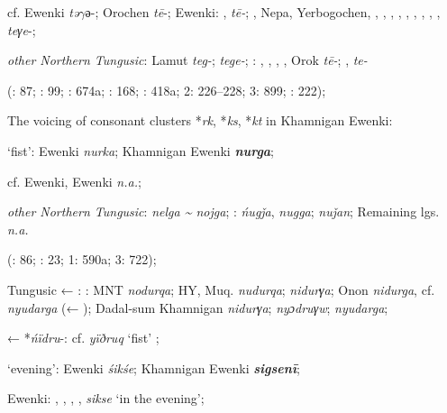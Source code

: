 \documentclass[output=paper,colorlinks,citecolor=brown]{langscibook}
\begin{document}
    cf.  Ewenki \textit{tǝ$\gamma ǝ$}{}-; Orochen \textit{tē}{}-;  Ewenki: ,  \textit{tē-}; , Nepa, Yerbogochen, , , , , , , , , ,  \textit{teγe}{}-;

    \textit{other Northern Tungusic}: Lamut \textit{teg-};  \textit{tege-}; \textit{}: , , , , Orok \textit{tē-}; ,  \textit{te-}
    
    (\citealt{Castrén1856}: 87; \citealt{Janhunen1991}: 99; \citealt{Dorji1998}: 674a; \citealt{Chaoke2014a}: 168; \citealt{Vasilevic1958}: 418a; \citealt{Cincius1975B} 2: 226--228; \citealt{Hauer1952} 3: 899; \citealt{Zikmundová2013a}: 222);
\z
\z


\ea
The voicing of consonant clusters *\textit{rk}, *\textit{ks}, *\textit{kt} in Khamnigan Ewenki:

\ea ‘fist’:  Ewenki \textit{nurka}; Khamnigan Ewenki \textbf{\textit{nurga}};

    cf.  Ewenki,  Ewenki \textit{n.a.};

    \textit{other Northern Tungusic}:  \textit{nelga {\textasciitilde} nojga}; \textit{}:  \textit{ńugǰa},  \textit{nugga};  \textit{nuǰan}; Remaining lgs. \textit{n.a.}
    
    (\citealt{Castrén1856}: 86; \citealt{Janhunen1991}: 23; \citealt{Cincius1975B} 1: 590a; \citealt{Hauer1952} 3: 722);

    Tungusic ← : : MNT \textit{nodurqa}; HY, Muq. \textit{nudurqa};  \textit{nidurγa}; Onon  \textit{nidurga}, cf. \textit{nyudarga} (← ); Dadal-sum Khamnigan \textit{nidurγa};  \textit{nyɔdruγw};  \textit{nyudarga};

     ←  *\textit{ńïdru}{}-: cf.  \textit{yïðruq} ‘fist’ \citep[120]{Khabtagaeva2017};

    \ex ‘evening’:  Ewenki \textit{śikśe}; Khamnigan Ewenki \textbf{\textit{sigsenī}};

     Ewenki: , , , ,  \textit{sikse} ‘in the evening’;
\end{document}
